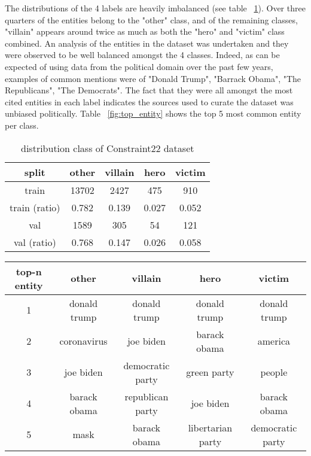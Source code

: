 \documentclass[11pt]{article}
\begin{document}
The distributions of the 4 labels are heavily imbalanced (see table ~\ref{fig:distrib_class}). Over three quarters of the entities belong to the "other" class, and of the remaining classes, "villain" appears around twice as much as both the "hero" and "victim" class combined. An analysis of the entities in the dataset was undertaken and they were observed to be well balanced amongst the 4 classes. Indeed, as can be expected of using data from the political domain over the past few years, examples of common mentions were of "Donald Trump", "Barrack Obama", "The Republicans", "The Democrats". The fact that they were all amongst the most cited entities in each label indicates the sources used to curate the dataset was unbiased politically. Table  ~\ref{fig:top_entity} shows the top 5 most common entity per class.
\begin{table}
\begin{tabular}{ | c || c  || c || c || c |  }
 \hline
 \textbf{split} & \textbf{other} & \textbf{villain} & \textbf{hero} & \textbf{victim} \\
 \hline
 train  & 13702 & 2427 & 475 & 910\\ %
  \hline
 train (ratio)  & 0.782 & 0.139 & 0.027 & 0.052\\ %
  \hline
 val   & 1589 & 305 & 54 & 121\\ %
  \hline
 val (ratio)  & 0.768 & 0.147 & 0.026 & 0.058\\ %
 \hline
\end{tabular}
\caption{ distribution class of Constraint22 dataset}
 \label{fig:distrib_class}
\end{table}

\begin{table*}
\centering
\begin{tabular}{ | c || c || c || c || c |  }
 \hline
 \textbf{top-n entity} & \textbf{other} & \textbf{villain} & \textbf{hero} & \textbf{victim} \\
 \hline
 1  & donald trump & donald trump & donald trump & donald trump\\ %
  \hline
 2   & coronavirus & joe biden  & barack obama & america\\ %
  \hline
 3   & joe biden & democratic party & green party & people \\ %
  \hline
 4   & barack obama & republican party & joe biden & barack obama\\ %
  \hline
 5   & mask & barack obama & libertarian party & democratic party\\ %
 \hline
\end{tabular}
\caption{ Top 5 most common entities per class in training dataset}
 \label{fig:top_entity}
\end{table*}
\end{document}
